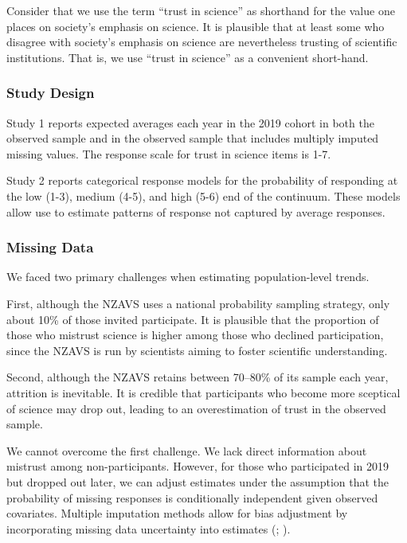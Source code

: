 \documentclass[
  single column]{article}
\begin{document}
Consider that we use the term ``trust in science'' as shorthand for the
value one places on society's emphasis on science. It is plausible that
at least some who disagree with society's emphasis on science are
nevertheless trusting of scientific institutions. That is, we use
``trust in science'' as a convenient short-hand.

\subsubsection{Study Design}\label{study-design}

Study 1 reports expected averages each year in the 2019 cohort in both
the observed sample and in the observed sample that includes multiply
imputed missing values. The response scale for trust in science items is
1-7.

Study 2 reports categorical response models for the probability of
responding at the low (1-3), medium (4-5), and high (5-6) end of the
continuum. These models allow use to estimate patterns of response not
captured by average responses.

\subsubsection{Missing Data}\label{missing-data}

We faced two primary challenges when estimating population-level trends.

First, although the NZAVS uses a national probability sampling strategy,
only about 10\% of those invited participate. It is plausible that the
proportion of those who mistrust science is higher among those who
declined participation, since the NZAVS is run by scientists aiming to
foster scientific understanding.

Second, although the NZAVS retains between 70--80\% of its sample each
year, attrition is inevitable. It is credible that participants who
become more sceptical of science may drop out, leading to an
overestimation of trust in the observed sample.

We cannot overcome the first challenge. We lack direct information about
mistrust among non-participants. However, for those who participated in
2019 but dropped out later, we can adjust estimates under the assumption
that the probability of missing responses is conditionally independent
given observed covariates. Multiple imputation methods allow for bias
adjustment by incorporating missing data uncertainty into estimates
(;
).
\end{document}
